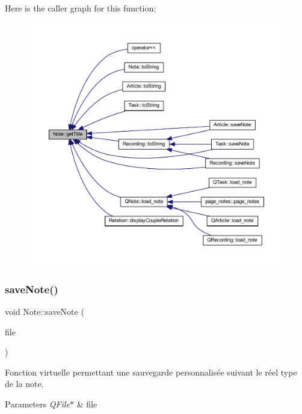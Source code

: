 Here is the caller graph for this function\+:\nopagebreak
\begin{figure}[H]
\begin{center}
\leavevmode
\includegraphics[width=350pt]{class_note_afd40e5372b7fd231bbd31038bf0bb4d9_icgraph}
\end{center}
\end{figure}
\mbox{\label{class_note_a0c2cc72d7f3235c665a30ef915c5c58d}} 
\subsubsection{\texorpdfstring{save\+Note()}{saveNote()}}
{\footnotesize\ttfamily void Note\+::save\+Note (\begin{DoxyParamCaption}\item[{Q\+File $\ast$}]{file }\end{DoxyParamCaption})\hspace{0.3cm}{\ttfamily [virtual]}}



Fonction virtuelle permettant une sauvegarde personnalisée suivant le réel type de la note. 


\begin{DoxyParams}{Parameters}
{\em Q\+File$\ast$} & file \\
\hline
\end{DoxyParams}


